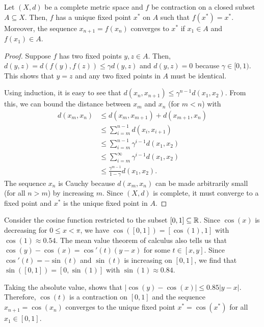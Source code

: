 \begin{theorem}
Let $(X,d)$ be a complete metric space and $f$ be contraction on a closed subset $A \subseteq X$.
Then, $f$ has a unique fixed point $x^*$ on $A$ such that $f(x^*) = x^*$.
Moreover, the sequence $x_{n+1} = f(x_n)$ converges to $x^*$ if $x_1 \in A$ and $f(x_1) \in A$.
\end{theorem}
\begin{proof}
Suppose $f$ has two fixed points $y,z\in A$.
Then, $d(y,z) = d \left(f(y),f(z) \right) \leq \gamma  d(y,z)$ and $d(y,z) = 0$ because $\gamma \in [0,1)$.
This shows that $y=z$ and any two fixed points in $A$ must be identical.

Using induction, it is easy to see that $d(x_n,x_{n+1}) \leq \gamma^{n-1} d(x_1,x_2)$.
From this, we can bound the distance between $x_m$ and $x_n$ (for $m<n$) with
\begin{align*}
d(x_m,x_n)
& \leq d(x_m,x_{m+1}) + d(x_{m+1},x_n) \\
& \leq \sum_{i=m}^{n-1} d(x_i,x_{i+1}) \\
& \leq \sum_{i=m}^{n-1} \gamma^{i-1} d(x_1,x_2) \\
& \leq \sum_{i=m}^\infty \gamma^{i-1} d(x_1,x_2) \\
& \leq \frac{\gamma^{m-1}}{1-\gamma} d(x_1,x_2).
\end{align*}
The sequence $x_n$ is Cauchy because $d(x_m,x_n)$ can be made arbitrarily small (for all $n>m$) by increasing $m$.
Since $(X,d)$ is complete, it must converge to a fixed point and $x^*$ is the unique fixed point in $A$.
\end{proof}

\begin{example}
Consider the cosine function restricted to the subset $[0,1]\subseteq \mathbb{R}$.
Since $\cos(x)$ is decreasing for $0 \leq x < \pi$, we have $\cos([0,1]) = [\cos(1),1]$ with $\cos(1) \approx 0.54$.
The mean value theorem of calculus also tells us that $\cos(y) - \cos(x) = \cos '(t) (y-x)$ for some $t\in [x,y]$.
Since $\cos '(t) = -\sin(t)$ and $\sin(t)$ is increasing on $[0,1]$, we find that $\sin([0,1]) = [0,\sin(1)]$ with $\sin(1) \approx 0.84$.

Taking the absolute value, shows that $| \cos(y) - \cos(x) | \leq 0.85 |y-x|$.
Therefore, $\cos(t)$ is a contraction on $[0,1]$ and the sequence $x_{n+1} = \cos(x_n)$ converges to the unique fixed point $x^* = \cos(x^*)$ for all $x_1 \in [0,1]$.
\end{example}

